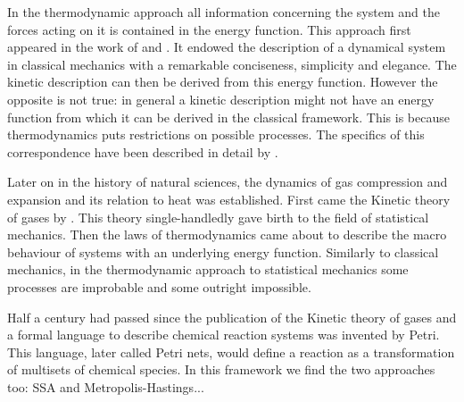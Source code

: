 In the thermodynamic approach
all information concerning the system and the forces acting on it
is contained in the energy function.
This approach first appeared in the work of
\citet{lagrange2} and \citet{hamilton}.
It endowed the description of a dynamical system in classical mechanics
with a remarkable conciseness, simplicity and elegance.
The kinetic description can then be derived from this energy function.
However the opposite is not true:
in general a kinetic description might not have an energy function
from which it can be derived in the classical framework.
This is because thermodynamics puts restrictions on possible processes.
The specifics of this correspondence have been described
in detail by . %

Later on in the history of natural sciences,
the dynamics of gas compression and expansion
and its relation to heat was established.
First came the Kinetic theory of gases by . %
This theory single-handledly gave birth to
the field of statistical mechanics. %
Then the laws of thermodynamics came about
to describe the macro behaviour of systems
with an underlying energy function. %
Similarly to classical mechanics,
in the thermodynamic approach to statistical mechanics
some processes are improbable and some outright impossible.

Half a century had passed since the publication of
the Kinetic theory of gases and 
a formal language to describe chemical reaction systems
was invented by Petri. %
This language, later called Petri nets,
would define a reaction as a transformation of
multisets of chemical species.
In this framework we find the two approaches too:
SSA and Metropolis-Hastings...

